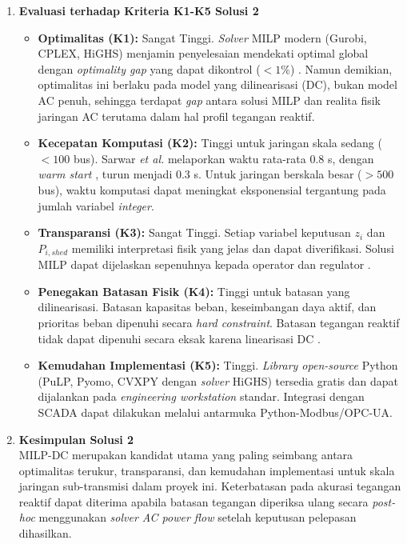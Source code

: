 \begin{enumerate}
\item[b.] \textbf{Evaluasi terhadap Kriteria K1-K5 Solusi 2}
\begin{itemize}
    \item[i.] \textbf{Optimalitas (K1):} Sangat Tinggi. \textit{Solver} MILP modern (Gurobi, CPLEX, HiGHS) menjamin penyelesaian mendekati optimal global dengan \textit{optimality gap} yang dapat dikontrol ($<1\%$) \cite{Sarwar2020, Sarwar2022}. Namun demikian, optimalitas ini berlaku pada model yang dilinearisasi (DC), bukan model AC penuh, sehingga terdapat \textit{gap} antara solusi MILP dan realita fisik jaringan AC terutama dalam hal profil tegangan reaktif.
    \item[ii.] \textbf{Kecepatan Komputasi (K2):} Tinggi untuk jaringan skala sedang ($<100$ bus). Sarwar \textit{et al.} \cite{Sarwar2020} melaporkan waktu rata-rata 0.8 s, dengan \textit{warm start} \cite{Sarwar2022}, turun menjadi 0.3 s. Untuk jaringan berskala besar ($> 500$ bus), waktu komputasi dapat meningkat eksponensial tergantung pada jumlah variabel \textit{integer}.
    \item[iii.] \textbf{Transparansi (K3):} Sangat Tinggi. Setiap variabel keputusan $z_{i}$ dan $P_{i,shed}$ memiliki interpretasi fisik yang jelas dan dapat diverifikasi. Solusi MILP dapat dijelaskan sepenuhnya kepada operator dan regulator \cite{Sarwar2020, Babagana2025}.
    \item[iv.] \textbf{Penegakan Batasan Fisik (K4):} Tinggi untuk batasan yang dilinearisasi. Batasan kapasitas beban, keseimbangan daya aktif, dan prioritas beban dipenuhi secara \textit{hard constraint}. Batasan tegangan reaktif tidak dapat dipenuhi secara eksak karena linearisasi DC \cite{Parniani2006, Sarwar2020}.
    \item[v.] \textbf{Kemudahan Implementasi (K5):} Tinggi. \textit{Library open-source} Python (PuLP, Pyomo, CVXPY dengan \textit{solver} HiGHS) tersedia gratis dan dapat dijalankan pada \textit{engineering workstation} standar. Integrasi dengan SCADA dapat dilakukan melalui antarmuka Python-Modbus/OPC-UA.
\end{itemize}
 
\item[c.] \textbf{Kesimpulan Solusi 2} \\
MILP-DC merupakan kandidat utama yang paling seimbang antara optimalitas terukur, transparansi, dan kemudahan implementasi untuk skala jaringan sub-transmisi dalam proyek ini. Keterbatasan pada akurasi tegangan reaktif dapat diterima apabila batasan tegangan diperiksa ulang secara \textit{post-hoc} menggunakan \textit{solver AC power flow} setelah keputusan pelepasan dihasilkan.
\end{enumerate}

